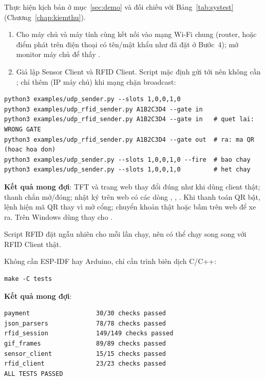 Thực hiện kịch bản ở mục~\ref{sec:demo} và đối chiếu với Bảng~\ref{tab:systest}
(Chương~\ref{chap:kiemthu}).

\begin{enumerate}
  \item Cho máy chủ và máy tính cùng kết nối vào mạng Wi-Fi chung (router, hoặc điểm phát
        trên điện thoại có tên/mật khẩu như đã đặt ở Bước~4); mở monitor máy chủ để
        thấy .
  \item Giả lập Sensor Client và RFID Client. Script mặc định gửi tới
         nên không cần ; chỉ thêm 
        (IP máy chủ) khi mạng chặn broadcast:
\end{enumerate}
\begin{lstlisting}[style=shell]
python3 examples/udp_sender.py --slots 1,0,0,1,0
python3 examples/udp_rfid_sender.py A1B2C3D4 --gate in
python3 examples/udp_rfid_sender.py A1B2C3D4 --gate in   # quet lai: WRONG GATE
python3 examples/udp_rfid_sender.py A1B2C3D4 --gate out  # ra: ma QR (hoac hoa don)
python3 examples/udp_sender.py --slots 1,0,0,1,0 --fire  # bao chay
python3 examples/udp_sender.py --slots 1,0,0,1,0         # het chay
\end{lstlisting}
\textbf{Kết quả mong đợi}: TFT và trang web thay đổi đúng như khi dùng client thật;
thanh chắn mở/đóng; nhật ký trên web có các dòng , ,
. Khi thanh toán QR bật, lệnh  hiện mã QR thay vì mở cổng;
chuyển khoản thật hoặc bấm  trên web để xe ra. Trên Windows dùng
 thay cho .

Script RFID đặt  ngẫu nhiên cho mỗi lần chạy, nên có thể chạy song song với
RFID Client thật.

Không cần ESP-IDF hay Arduino, chỉ cần trình biên dịch C/C++:
\begin{lstlisting}[style=shell]
make -C tests
\end{lstlisting}
\textbf{Kết quả mong đợi}:
\begin{lstlisting}[language={},numbers=none]
payment                  30/30 checks passed
json_parsers             78/78 checks passed
rfid_session             149/149 checks passed
gif_frames               89/89 checks passed
sensor_client            15/15 checks passed
rfid_client              23/23 checks passed
ALL TESTS PASSED
\end{lstlisting}

